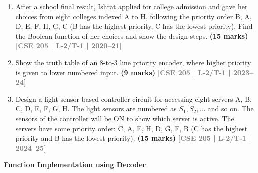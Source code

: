 \documentclass[12pt,a4paper]{article}
\newcommand{\yr}[1]{\hfill\textcolor{gray}{\small\textbf{[#1]}}}
\newcommand{\mk}[1]{\textcolor{orange!70!black}{\small\textbf{(#1 marks)}}}
\newcommand{\subtopic}[2]{%
  \vspace{10pt}
  \noindent\begin{tcolorbox}[colback=#1!8,colframe=#1,boxrule=0.6pt,arc=4pt,
    left=6pt,right=6pt,top=4pt,bottom=4pt]
    \small\bfseries\textcolor{#1}{#2}
  \end{tcolorbox}
  \vspace{2pt}
}
\begin{document}
\begin{enumerate}
\item After a school final result, Ishrat applied for college admission and gave her choices from eight colleges indexed A to H, following the priority order B, A, D, E, F, H, G, C (B has the highest priority, C has the lowest priority). Find the Boolean function of her choices and show the design steps.
\mk{15} \yr{CSE 205 | L-2/T-1 | 2020--21}

\item Show the truth table of an 8-to-3 line priority encoder, where higher priority is given to lower numbered input.
\mk{9} \yr{CSE 205 | L-2/T-1 | 2023--24}

\item Design a light sensor based controller circuit for accessing eight servers A, B, C, D, E, F, G, H. The light sensors are numbered as $S_1, S_2, \ldots$ and so on. The sensors of the controller will be ON to show which server is active. The servers have some priority order: C, A, E, H, D, G, F, B (C has the highest priority and B has the lowest priority).
\mk{15} \yr{CSE 205 | L-2/T-1 | 2024--25}

\end{enumerate}

\subtopic{cD}{Function Implementation using Decoder}
\label{sub:s4-decoder-func}
\end{document}
